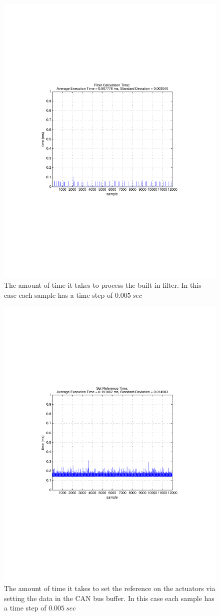 \begin{figure}[thpb]
  \centering
\includegraphics[width=0.6\columnwidth]{./timingData/filter.pdf}
  \caption{The amount of time it takes to process the built in filter.  In this case each sample has a time step of $0.005~sec$}
  \label{fig:timing-filter}
\end{figure}




\begin{figure}[thpb]
  \centering
\includegraphics[width=0.6\columnwidth]{./timingData/setRef.pdf}
  \caption{The amount of time it takes to set the reference on the actuators via setting the data in the CAN bus buffer.  In this case each sample has a time step of $0.005~sec$}
  \label{fig:timing-setRef}
\end{figure}

